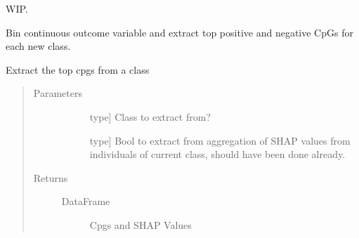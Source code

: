 \documentclass[letterpaper,10pt,english]{sphinxmanual}
\begin{document}
\begin{fulllineitems}
\begin{fulllineitems}
\label{\detokenize{index:methylnet.interpretation_classes.ShapleyDataExplorer.add_abs_value_classes}}
WIP.

\end{fulllineitems}


\begin{fulllineitems}
\label{\detokenize{index:methylnet.interpretation_classes.ShapleyDataExplorer.add_bin_continuous_classes}}
Bin continuous outcome variable and extract top positive and negative CpGs for each new class.

\end{fulllineitems}


\begin{fulllineitems}
\label{\detokenize{index:methylnet.interpretation_classes.ShapleyDataExplorer.extract_class}}
Extract the top cpgs from a class
\begin{quote}\begin{description}
\item[{Parameters}] \leavevmode\begin{description}
\item[{}] \leavevmode{[}type{]}
Class to extract from?

\item[{}] \leavevmode{[}type{]}
Bool to extract from aggregation of SHAP values from individuals of current class, should have been done already.

\end{description}

\item[{Returns}] \leavevmode\begin{description}
\item[{DataFrame}] \leavevmode
Cpgs and SHAP Values


\end{description}
\end{description}
\end{quote}
\end{fulllineitems}
\end{fulllineitems}
\end{document}
